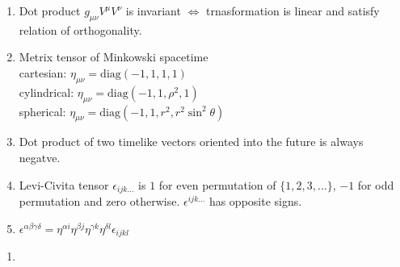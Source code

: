 \documentclass{article}
\begin{document}
\begin{multicols}{3}
\begin{enumerate}
        \item Dot product $g_{\mu\nu}V^\mu V^\nu$ is invariant $\Leftrightarrow$ trnasformation is linear and satisfy relation of orthogonality.
        \item Metrix tensor of Minkowski spacetime \\cartesian: $\eta_{\mu\nu}=\text{diag}(-1,1,1,1)$\\cylindrical: $\eta_{\mu\nu}=\text{diag}(-1,1,\rho^2,1)$\\spherical: $\eta_{\mu\nu}=\text{diag}(-1,1,r^2,r^2\sin^2\theta)$
        \item Dot product of two timelike vectors oriented into the future is always negatve.
        \item Levi-Civita tensor $\epsilon_{ijk\ldots}$ is $1$ for even permutation of $\{1,2,3,\ldots\}$, $-1$ for odd permutation and zero otherwise. $\epsilon^{ijk\ldots}$ has opposite signs.
        \item $\epsilon^{\alpha\beta\gamma\delta}=\eta^{\alpha i}\eta^{\beta j}\eta^{\gamma k}\eta^{\delta l}\epsilon_{ijkl}$
    \end{enumerate}



    \begin{enumerate}
        \item
    \end{enumerate}



\end{multicols}
\end{document}
